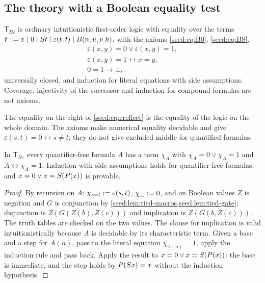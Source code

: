 \subsection{The theory with a Boolean equality test}

\begin{definition}\label{seed:def:tbe}
$\mathsf{T}_{B\varepsilon}$ is ordinary intuitionistic first-order logic
with equality over the terms
$t\mathrel{::=}x\mid0\mid S t\mid\varepsilon(t,t)\mid B(n;u,v.h)$, with
the axioms \eqref{seed:eq:B0}, \eqref{seed:eq:BS},
\begin{gather}
 \varepsilon(x,y)=0\lor\varepsilon(x,y)=1, \label{seed:eq:erange}\\
 \varepsilon(x,y)=1\leftrightarrow x=y, \label{seed:eq:ereflect}\\
 0=1\to\bot, \label{seed:eq:sep}
\end{gather}
universally closed, and induction for literal equations with side
assumptions. Coverage, injectivity of the successor and induction for
compound formulas are not axioms.
\end{definition}

The equality on the right of \eqref{seed:eq:ereflect} is the equality of the
logic on the whole domain. The axioms make numerical equality decidable and
give $\varepsilon(s,t)=0\leftrightarrow s\neq t$; they do not give excluded
middle for quantified formulas.

\begin{lemma}\label{seed:lem:tbe-qf}
In $\mathsf{T}_{B\varepsilon}$ every quantifier-free formula $A$ has a term
$\chi_A$ with $\chi_A=0\lor\chi_A=1$ and $A\leftrightarrow\chi_A=1$.
Induction with side assumptions holds for quantifier-free formulas, and
$x=0\lor x=S(P(x))$ is provable.
\end{lemma}

\begin{proof}
By recursion on $A$: $\chi_{s=t}\mathrel{:=}\varepsilon(s,t)$, $\chi_\bot\mathrel{:=}0$,
and on Boolean values $Z$ is negation and $G$ is conjunction by
\cref{seed:lem:tied-macros,seed:lem:tied-gate}; disjunction is
$Z(G(Z(b),Z(c)))$ and implication is $Z(G(b,Z(c)))$. The truth tables are
checked on the two values. The clause for implication is valid
intuitionistically because $A$ is decidable by its characteristic term.
Given a base and a step for $A(n)$, pass to the literal equation
$\chi_{A(n)}=1$, apply the induction rule and pass back. Apply the result to
$x=0\lor x=S(P(x))$: the base is immediate, and the step holds by
$P(S x)=x$ without the induction hypothesis.
\end{proof}

